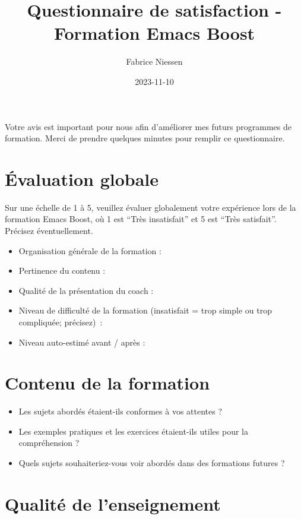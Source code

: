 \documentclass[final]{mcarticle}
\author{Fabrice Niessen}
\date{2023-11-10}
\title{Questionnaire de satisfaction - Formation Emacs Boost}
\begin{document}
\maketitle
Votre avis est important pour nous afin d'améliorer mes futurs programmes de
formation. Merci de prendre quelques minutes pour remplir ce questionnaire.

\section{Évaluation globale}
\label{sec:org2049103}

Sur une échelle de 1 à 5, veuillez évaluer globalement votre expérience lors de
la formation Emacs Boost, où 1 est ``Très insatisfait'' et 5 est ``Très
satisfait''. Précisez éventuellement.

\begin{itemize}
\item Organisation générale de la formation :

\item Pertinence du contenu :

\item Qualité de la présentation du coach :

\item Niveau de difficulté de la formation (insatisfait = trop simple ou trop
compliquée; précisez)~:

\item Niveau auto-estimé avant / après :
\end{itemize}

\section{Contenu de la formation}
\label{sec:orgcac4190}

\begin{itemize}
\item Les sujets abordés étaient-ils conformes à vos attentes ?

\item Les exemples pratiques et les exercices étaient-ils utiles pour la
compréhension ?

\item Quels sujets souhaiteriez-vous voir abordés dans des formations futures ?
\end{itemize}

\vspace{13pt}

\section{Qualité de l'enseignement}
\label{sec:org9100eea}
\end{document}
